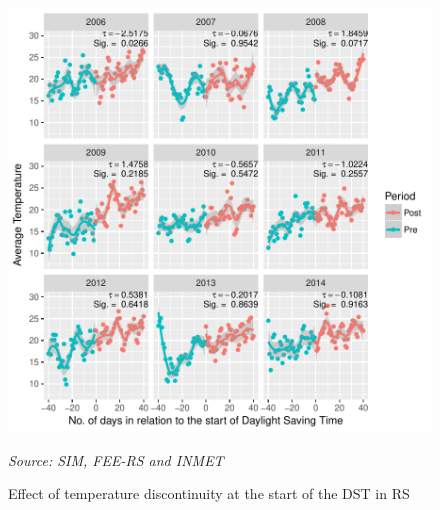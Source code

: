 \documentclass[12pt,openright,oneside,a4paper,english,french,spanish]{abntex2}
\numberwithin{table}{section} %
\numberwithin{figure}{section} %
\newcommand{\source}[1]{\textit{#1}}
\begin{document}
\begin{otherlanguage}{english}
\begin{subappendices}
\begin{figure}[H]
\begin{center}
\includegraphics{TESE_DE_DOUTORADO_RENAN_FINAL-plot_efeito_descontinuo_temp_entrada}
\end{center}
\caption{Effect of temperature discontinuity at the start of the DST in RS}
\source{Source: SIM, FEE-RS and INMET}
\label{fig:efeito_descon_temp_entrada_RS}
\end{figure}


\end{subappendices}
\end{otherlanguage}
\end{document}

